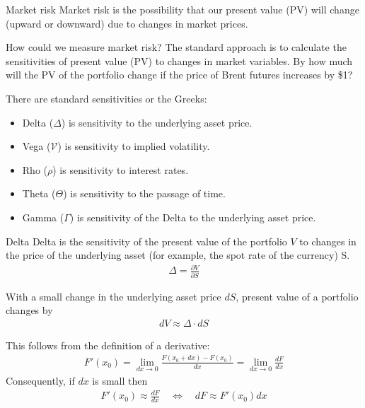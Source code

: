 \documentclass{beamer}
\begin{document}
\begin{frame}{Market risk}
\justify
\alert{Market risk} is the possibility that our present value (PV) will change (upward or downward) due to changes in market prices.

\justify
How could we  measure market risk? The standard approach is to calculate the sensitivities of present value (PV) to changes in market variables. By how much will the PV of the portfolio change if the price of Brent futures increases by \$1?

\justify
There are standard sensitivities or the Greeks:
\begin{itemize}
\item Delta ($\Delta$) is sensitivity to the underlying asset price.
\item Vega ($\mathcal{V}$) is sensitivity to implied volatility.
\item Rho ($\rho$) is sensitivity to interest rates.
\item Theta ($\Theta$) is sensitivity to the passage of time.
\item Gamma ($\Gamma$) is sensitivity of the Delta to the underlying asset price.
\end{itemize}
\end{frame}



\begin{frame}{Delta}
\justify
Delta is the sensitivity of the present value of the portfolio $V$ to changes in the price of the underlying asset (for example, the spot rate of the currency) S$.$
\begin{align*}
\Delta = \frac{\partial V}{\partial S}
\end{align*}

\justify
With a small change in the underlying asset price $dS$, present value of a portfolio changes by
\begin{align*}
dV \approx \Delta\cdot dS
\end{align*}

\justify
This follows from the definition of a derivative:
\begin{align*}
F'(x_0) = \lim_{dx \to 0} \frac{F(x_0+dx) - F(x_0)}{dx} = \lim_{dx \to 0} \frac{dF}{dx}
\end{align*}
Consequently, if $dx$ is small then
\begin{align*}
F'(x_0) \approx \frac{dF}{dx} \quad \Leftrightarrow \quad dF \approx F'(x_0)dx
\end{align*}
\end{frame}
\end{document}
